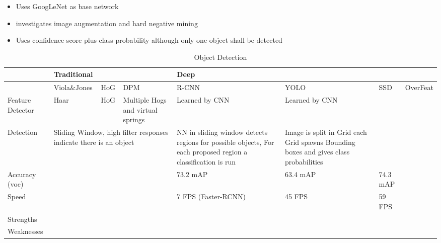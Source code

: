 	\begin{itemize}
		\item Uses GoogLeNet as base network
		\item investigates image augmentation and hard negative mining
		\item Uses confidence score plus class probability although only one object shall be detected
	\end{itemize}
		

\begin{table}[]
	
	\caption{Object Detection}
	\label{my-label}
	\begin{tabular}{|p{3cm}|p{3cm}|p{3cm}|p{3cm}|p{3cm}|p{3cm}|p{3cm}|p{3cm}|}
		\hline
		& \multicolumn{3}{l|}{Traditional} & \multicolumn{4}{l|}{Deep}   \\ \hline
		& Viola\&Jones    				   & HoG    & DPM   		   & R-CNN    & YOLO         & SSD & OverFeat \\ \hline
		Feature Detector & Haar					   & HoG    & Multiple Hogs and virtual springs   & Learned by CNN     &  Learned by CNN            & & \\ \hline
		Detection & \multicolumn{3}{l|}{Sliding Window, high filter responses indicate there is an object} & NN in sliding window detects regions for possible objects, For each proposed region a classification is run & Image is split in Grid each Grid spawns Bounding boxes and gives class probabilities & & \\
		\hline
		Accuracy (voc) &  & & & 73.2 mAP & 63.4 mAP & 74.3 mAP & \\ 
		\hline
		Speed & & & & 7 FPS (Faster-RCNN) & 45 FPS & 59 FPS & \\
		\hline
		Strengths & & & & & &  &\\
		\hline
		Weaknesses & & & & & &  &\\
		\hline
		\end{tabular}
		
		\end{table}


